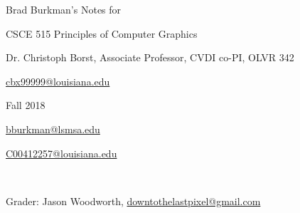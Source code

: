 \documentclass[12pt]{article}
\begin{document}
\setlength{\parindent}{0pt}
\begin{spacing}{1.2}

Brad Burkman's Notes for

\qquad CSCE 515 Principles of Computer Graphics

\qquad Dr. Christoph Borst, Associate Professor, CVDI co-PI, OLVR 342

\qquad {}

\qquad \qquad \url{cbx99999@louisiana.edu}

\qquad Fall 2018

\url{bburkman@lsmsa.edu}

\url{C00412257@louisiana.edu}

\

Grader:  Jason Woodworth, \url{downtothelastpixel@gmail.com}

\tableofcontents



















%
%

\end{spacing}
\end{document}
